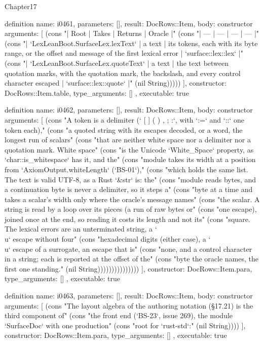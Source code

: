 \begin{lexlean}{Chapter17}
\begin{semanticmodule}
definition{
  name: i0461,
  parameters: [],
  result: DocRows::Item,
  body: constructor{
    arguments: [
      (cons "| Root | Takes | Returns | Oracle |" (cons "| --- | --- | --- | --- |" (cons "| `LexLeanBoot.SurfaceLex.lexText` | a text | its tokens, each with its byte range, or the offset and message of the first lexical error | `surface::lex::lex` |" (cons "| `LexLeanBoot.SurfaceLex.quoteText` | a text | the text between quotation marks, with the quotation mark, the backslash, and every control character escaped | `surface::lex::quote` |" (nil String)))))
    ],
    constructor: DocRows::Item.table,
    type_arguments: []
  },
  executable: true
}

definition{
  name: i0462,
  parameters: [],
  result: DocRows::Item,
  body: constructor{
    arguments: [
      (cons "A token is a delimiter (`{ } [ ] ( ) , ; :`, with `:=` and `::` one token each)," (cons "a quoted string with its escapes decoded, or a word, the longest run of scalars" (cons "that are neither white space nor a delimiter nor a quotation mark. White space" (cons "is the Unicode `White_Space` property, as `char::is_whitespace` has it, and the" (cons "module takes its width at a position from `AxiomOutput.whiteLength` (`BS-01`)," (cons "which holds the same list. The text is valid UTF-8, as a Rust `&str` is: the" (cons "module reads bytes, and a continuation byte is never a delimiter, so it steps a" (cons "byte at a time and takes a scalar's width only where the oracle's message names" (cons "the scalar. A string is read by a loop over its pieces (a run of raw bytes or" (cons "one escape), joined once at the end, so reading it costs its length and not its" (cons "square. The lexical errors are an unterminated string, a `\\u` escape without four" (cons "hexadecimal digits (either case), a `\\u` escape of a surrogate, an escape that is" (cons "none, and a control character in a string; each is reported at the offset of the" (cons "byte the oracle names, the first one standing." (nil String)))))))))))))))
    ],
    constructor: DocRows::Item.para,
    type_arguments: []
  },
  executable: true
}

definition{
  name: i0463,
  parameters: [],
  result: DocRows::Item,
  body: constructor{
    arguments: [
      (cons "The layout algebra of the authoring notation (§17.21) is the third component of" (cons "the front end (`BS-23`, issue 269), the module `SurfaceDoc` with one production" (cons "root for `rust-std`:" (nil String))))
    ],
    constructor: DocRows::Item.para,
    type_arguments: []
  },
  executable: true
}


\end{semanticmodule}
\end{lexlean}

